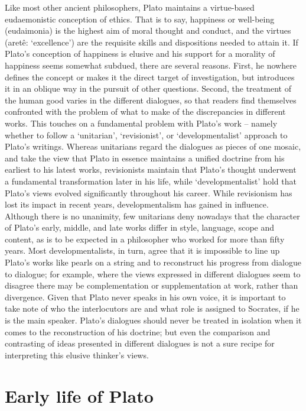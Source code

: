 \documentclass[11pt]{article}
\begin{document}
		 Like most other ancient philosophers, Plato maintains a virtue-based eudaemonistic conception of ethics. That is to say, happiness or well-being (eudaimonia) is the highest aim of moral thought and conduct, and the virtues (aretê: `excellence') are the requisite skills and dispositions needed to attain it. If Plato's conception of happiness is elusive and his support for a morality of happiness seems somewhat subdued, there are several reasons. First, he nowhere defines the concept or makes it the direct target of investigation, but introduces it in an oblique way in the pursuit of other questions. Second, the treatment of the human good varies in the different dialogues, so that readers find themselves confronted with the problem of what to make of the discrepancies in different works. This touches on a fundamental problem with Plato's work – namely whether to follow a `unitarian', `revisionist', or `developmentalist' approach to Plato's writings. Whereas unitarians regard the dialogues as pieces of one mosaic, and take the view that Plato in essence maintains a unified doctrine from his earliest to his latest works, revisionists maintain that Plato's thought underwent a fundamental transformation later in his life, while `developmentalist' hold that Plato's views evolved significantly throughout his career. While revisionism has lost its impact in recent years, developmentalism has gained in influence. Although there is no unanimity, few unitarians deny nowadays that the character of Plato's early, middle, and late works differ in style, language, scope and content, as is to be expected in a philosopher who worked for more than fifty years. Most developmentalists, in turn, agree that it is impossible to line up Plato's works like pearls on a string and to reconstruct his progress from dialogue to dialogue; for example, where the views expressed in different dialogues seem to disagree there may be complementation or supplementation at work, rather than divergence. Given that Plato never speaks in his own voice, it is important to take note of who the interlocutors are and what role is assigned to Socrates, if he is the main speaker. Plato's dialogues should never be treated in isolation when it comes to the reconstruction of his doctrine; but even the comparison and contrasting of ideas presented in different dialogues is not a sure recipe for interpreting this elusive thinker's views.

	\section{Early life of Plato} %
\end{document}
